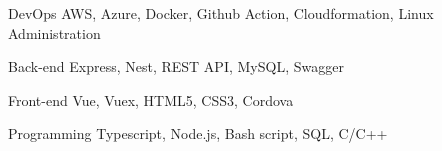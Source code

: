 

\begin{cvskills}

  \cvskill
    {DevOps} %
    {AWS, Azure, Docker, Github Action, Cloudformation, Linux Administration} %

  \cvskill
    {Back-end} %
    {Express, Nest, REST API, MySQL, Swagger} %

  \cvskill
    {Front-end} %
    {Vue, Vuex, HTML5, CSS3, Cordova} %

  \cvskill
    {Programming} %
    {Typescript, Node.js, Bash script, SQL, C/C++} %

\end{cvskills}
